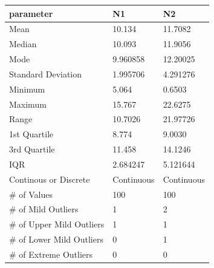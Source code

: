 \documentclass[10pt]{article}
\begin{document}
\begin{table}[h!]
  \begin{center}
    \scriptsize
    \begin{tabular}{lll}
      \toprule
      parameter & N1 & N2\\
      \midrule
 	Mean & 10.134 & 11.7082\\
	Median & 10.093 & 11.9056\\
	Mode & 9.960858 & 12.20025\\
	Standard Deviation & 1.995706 & 4.291276\\
	Minimum & 5.064 & 0.6503\\
	Maximum & 15.767 & 22.6275\\
	Range & 10.7026 & 21.97726\\
	1st Quartile & 8.774 & 9.0030\\
	3rd Quartile & 11.458 & 14.1246\\
	IQR & 2.684247 & 5.121644\\ 
	Continous or Discrete & Continuous & Continuous\\  
	\# of Values & 100 & 100\\
	\# of Mild Outliers & 1 & 2\\
	\# of Upper Mild Outliers & 1 & 1\\
	\# of Lower Mild Outliers & 0 & 1\\
	\# of Extreme Outliers & 0 & 0\\
       \bottomrule
    \end{tabular}
  \end{center}
\end{table}
\end{document}
